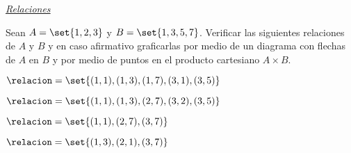 \def\nodosDiecisiete{
  \node[nodo=black, label=left:$1$] (1) {};
  \node[nodo=black, label=left:$2$, below of=1] (2) {};
  \node[nodo=black, label=left:$3$, below of=2] (3) {};

  \draw[thick, rounded corners = 10pt]
  ([xshift=5pt,yshift=-5pt]current bounding box.south east)
  rectangle
  ([xshift=-5pt,yshift=5pt]current bounding box.north west) node [left] {$A$};

  \node[nodo=black, label=right:$1$, right of=1] (1b) {};
  \node[nodo=black, label=right:$3$, below of=1b] (3b) {};
  \node[nodo=black, label=right:$5$, below of=3b] (5) {};
  \node[nodo=black, label=right:$7$, below of=5] (7) {};

  \draw[rectangle, draw, fit={(1b) (3b) (5) (7)}, thick, rounded corners = 10pt]
  ([xshift=-5pt, yshift=-5pt]7.south west)
  rectangle
  ([xshift=20pt, yshift=5pt]1b.north east) node [left] {$B$};
}

\separador

\underline{\textit{Relaciones}}

\begin{enunciado}{\ejercicio}
  Sean $A = \set{1, 2, 3}$ y $B = \set{1, 3, 5, 7}$. Verificar las siguientes
  relaciones de $A$ y $B$ y en caso afirmativo graficarlas por medio de un diagrama
  con flechas de $A$ en $B$ y por medio de puntos en el producto cartesiano $A \times B$.
  \begin{enumerate}[label=\roman*)]
    \begin{multicols}{2}
      \item  $\relacion = \set{(1,1), (1,3), (1,7), (3,1), (3,5)}$
      \item $\relacion = \set{(1,1), (1,3), (2,7), (3,2), (3,5)}$
      \item $\relacion = \set{(1,1), (2,7), (3,7)}$
      \item  $\relacion = \set{(1,3), (2,1), (3,7)}$
    \end{multicols}
  \end{enumerate}
\end{enunciado}

